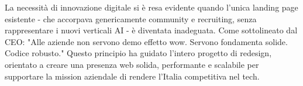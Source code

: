 La necessità di innovazione digitale si è resa evidente quando l'unica landing page esistente - che accorpava genericamente community e recruiting, senza rappresentare i nuovi verticali AI - è diventata inadeguata. Come sottolineato dal CEO: "Alle aziende non servono demo effetto wow. Servono fondamenta solide. Codice robusto." Questo principio ha guidato l'intero progetto di redesign, orientato a creare una presenza web solida, performante e scalabile per supportare la mission aziendale di rendere l'Italia competitiva nel tech.
